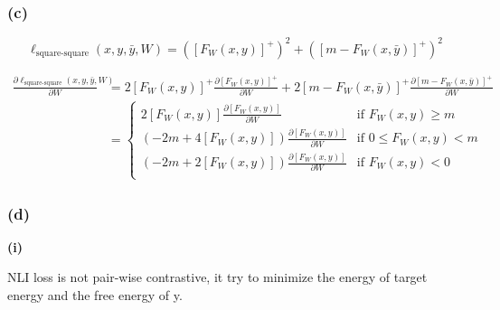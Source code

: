 \subsubsection*{(c)}
$$
    \ell_\text{square-square}(x, y, \bar y, W) = \left(\left[ F_W(x, y)\right]^+ \right)^2 + \left( \left[m - F_W(x, \bar y)\right]^+ \right)^2
$$

\begin{align}
    \frac{\partial \ell_\text{square-square}(x, y, \bar y, W)}{\partial W}
     & = 2 \left[F_W(x, y)\right]^+
    \frac{\partial \left[F_W(x, y)\right]^+}{\partial W}
    + 2 \left[m -F_W(x, \bar y)\right]^+
    \frac{\partial \left[m -F_W(x, \bar y)\right]^+}{\partial W}                                                              \\
     & = \begin{cases}
             2 \left[F_W(x, y)\right] \frac{\partial \left[F_W(x, y)\right]}{\partial W}         & \text{if } F_W(x, y) \geq m    \\
             (-2m + 4 \left[F_W(x, y)\right]) \frac{\partial \left[F_W(x, y)\right]}{\partial W} & \text{if }0 \leq F_W(x, y) < m \\
             (-2m +2 \left[F_W(x, y)\right])  \frac{\partial \left[F_W(x, y)\right]}{\partial W} & \text{if }  F_W(x, y) < 0      \\
         \end{cases}
\end{align}




\subsubsection*{(d)}
\textbf{(i)}

NLI loss is not pair-wise contrastive, it try to minimize the energy of target energy and the free energy of y.

